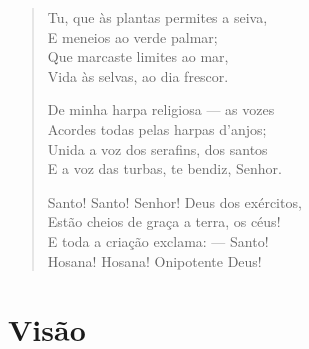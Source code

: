 \begin{verse}
Tu, que às plantas permites a seiva,\\
E meneios ao verde palmar;\\
Que marcaste limites ao mar,\\
Vida às selvas, ao dia frescor.

De minha harpa religiosa --- as vozes\\
Acordes todas pelas harpas d'anjos;\\
Unida a voz dos serafins, dos santos\\
E a voz das turbas, te bendiz, Senhor.

Santo! Santo! Senhor! Deus dos exércitos,\\
Estão cheios de graça a terra, os céus!\\
E toda a criação exclama: --- Santo!\\
Hosana! Hosana! Onipotente Deus!
\end{verse}

\chapter{Visão}

